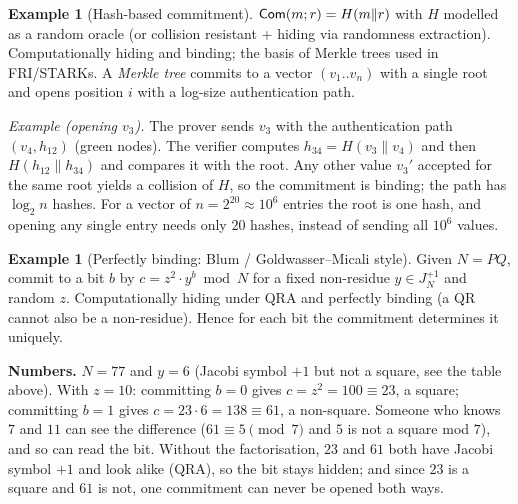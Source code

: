 \documentclass[11pt,a4paper]{report}
\theoremstyle{plain}
\theoremstyle{definition}
\newtheorem{example}[theorem]{Example}
\theoremstyle{remark}
\begin{document}
\begin{example}[Hash-based commitment]
$\mathsf{Com}(m;r)=H(m\|r)$ with $H$ modelled as a random oracle (or collision resistant + hiding via randomness extraction). Computationally hiding and binding; the basis of Merkle trees used in FRI/STARKs. A \emph{Merkle tree} commits to a vector $(v_1..v_n)$ with a single root and opens position $i$ with a log-size authentication path.
\begin{center}
\end{center}
\emph{Example (opening $v_3$).} The prover sends $v_3$ with the authentication path $(v_4,h_{12})$ (green nodes). The verifier computes $h_{34}=H(v_3\|v_4)$ and then $H(h_{12}\|h_{34})$ and compares it with the root. Any other value $v_3'$ accepted for the same root yields a collision of $H$, so the commitment is binding; the path has $\log_2n$ hashes.
For a vector of $n=2^{20}\approx10^6$ entries the root is one hash, and opening any single entry needs only $20$ hashes, instead of sending all $10^6$ values.
\end{example}
\begin{example}[Perfectly binding: Blum / Goldwasser--Micali style]
Given $N=PQ$, commit to a bit $b$ by $c=z^2\cdot y^b\bmod N$ for a fixed non-residue $y\in J_N^{+1}$ and random $z$. Computationally hiding under QRA and perfectly binding (a QR cannot also be a non-residue). Hence for each bit the commitment determines it uniquely.

\textbf{Numbers.} $N=77$ and $y=6$ (Jacobi symbol $+1$ but not a square, see the table above). With $z=10$: committing $b=0$ gives $c=z^2=100\equiv23$, a square; committing $b=1$ gives $c=23\cdot6=138\equiv61$, a non-square. Someone who knows $7$ and $11$ can see the difference ($61\equiv5\pmod7$ and $5$ is not a square mod $7$), and so can read the bit. Without the factorisation, $23$ and $61$ both have Jacobi symbol $+1$ and look alike (QRA), so the bit stays hidden; and since $23$ is a square and $61$ is not, one commitment can never be opened both ways.
\end{example}
\end{document}
